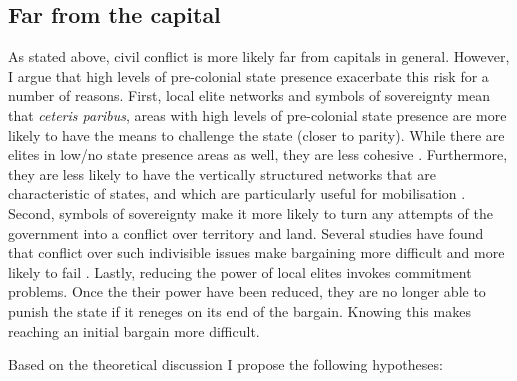 \subsection{Far from the capital} \label{Far from the capital}

As stated above, civil conflict is more likely far from capitals in general.
However, I argue that high levels of pre-colonial state presence exacerbate this
risk for a number of reasons. First, local elite networks and symbols of
sovereignty mean that \textit{ceteris paribus}, areas with high levels of
pre-colonial state presence are more likely to have the means to challenge the
state (closer to parity). While there are elites in low/no
state presence areas as well, they are less cohesive \citep{Wilfahrt_2021}.
Furthermore, they are less likely to have the vertically
structured networks that are characteristic of states, and which are
particularly useful for mobilisation \citep{Staniland2014}. Second, symbols of
sovereignty make it more likely to turn any attempts of the government into a
conflict over territory and land. Several studies have found that conflict over
such indivisible issues make bargaining more difficult and more likely to fail
\citep{ToftMonicaDuffy2003Tgoe}. Lastly, reducing the power of local elites
invokes commitment problems. Once the their power have been reduced, they are no
longer able to punish the state if it reneges on its end of the bargain. Knowing
this makes reaching an initial bargain more difficult. 

	
Based on the theoretical discussion I propose the following hypotheses:

